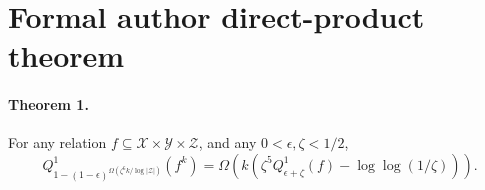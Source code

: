 \section*{Formal author direct-product theorem}
\paragraph{Theorem 1.} For any relation $f\subseteq\mathcal X\times\mathcal Y\times\mathcal Z$, and any $0<\epsilon,\zeta<1/2$,
\[Q^1_{1-(1-\epsilon)^{\Omega(\zeta^6k/\log|\mathcal Z|)}}(f^k)=\Omega\!\left(k\left(\zeta^5Q^1_{\epsilon+\zeta}(f)-\log\log(1/\zeta)\right)\right).\]
